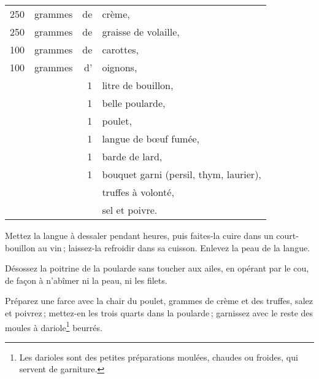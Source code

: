 \footnotesize
\begin{longtable}{rrrp{16em}}
    250 & grammes & de & crème,                                                                           \\
    250 & grammes & de & graisse de volaille,                                                             \\
    100 & grammes & de & carottes,                                                                        \\
    100 & grammes & d’ & oignons,                                                                         \\
        &         &  1 & litre de bouillon,                                                               \\
        &         &  1 & belle poularde,                                                                  \\
        &         &  1 & poulet,                                                                          \\
        &         &  1 & langue de bœuf fumée,                                                            \\
        &         &  1 & barde de lard,                                                                   \\
        &         &  1 & bouquet garni (persil, thym, laurier),                                           \\
        &         &    & truffes à volonté,                                                               \\
        &         &    & sel et poivre.                                                                   \\
\end{longtable}
\normalsize

Mettez la langue à dessaler pendant {\mmm} heures, puis faites-la cuire
dans un court-bouillon au vin ; laissez-la refroidir dans sa cuisson. Enlevez
la peau de la langue.

Désossez la poitrine de la poularde sans toucher aux ailes, en opérant par le
cou, de façon à n'abîmer ni la peau, ni les filets.

Préparez une farce avec la chair du poulet, {\mmm} grammes de crème et
des truffes, salez et poivrez ; mettez-en les trois quarts dans la poularde ;
garnissez avec le reste des moules à dariole\footnote{
Les darioles sont des petites préparations moulées, chaudes ou froides, qui
servent de garniture.} beurrés.

